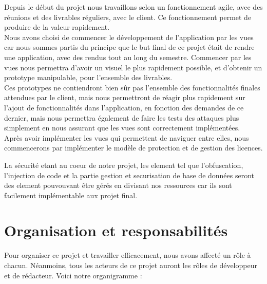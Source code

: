 Depuis le début du projet nous travaillons selon un fonctionnement agile, avec des
réunions et des livrables réguliers, avec le client. Ce fonctionnement permet de produire de
la valeur rapidement.\\ \newline
Nous avons choisi de commencer le développement de l’application par les vues car
nous sommes partis du principe que le but final de ce projet était de rendre une application,
avec des rendus tout au long du semestre. Commencer par les vues nous permettra d’avoir
un visuel le plus rapidement possible, et d’obtenir un prototype manipulable, pour l’ensemble
des livrables.\\ \newline
Ces prototypes ne contiendront bien sûr pas l’ensemble des fonctionnalités finales
attendues par le client, mais nous permettront de réagir plus rapidement sur l’ajout de
fonctionnalités dans l’application, en fonction des demandes de ce dernier, mais nous
permettra également de faire les tests des attaques plus simplement en nous assurant que
les vues sont correctement implémentées.\\ \newline
Après avoir implémenter les vues qui permettent de naviguer entre elles, nous
commencerons par implémenter le modèle de protection et de gestion des licences.\\ \newline

La sécurité etant au coeur de notre projet, les element tel que l'obfuscation, l'injection de code et la partie 
gestion et securisation de base de données seront des element pouvouvant être gérés en divisant nos ressources
car ils sont facilement implémentable aux projet final.

\chapter{Organisation et responsabilités}

Pour organiser ce projet et travailler efficacement, nous avons affecté un rôle à
chacun. Néanmoins, tous les acteurs de ce projet auront les rôles de développeur et de
rédacteur. Voici notre organigramme :\\ \newline


